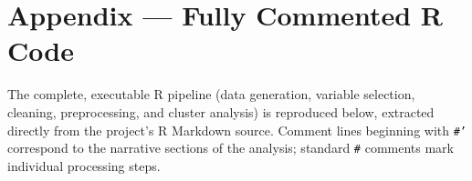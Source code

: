 \documentclass[11pt]{article}
\begin{document}
\clearpage
\appendix
\section{Appendix --- Fully Commented R Code}

The complete, executable R pipeline (data generation, variable selection, cleaning, preprocessing, and cluster analysis) is reproduced below, extracted directly from the project's R Markdown source. Comment lines beginning with \texttt{\#'} correspond to the narrative sections of the analysis; standard \texttt{\#} comments mark individual processing steps.


\end{document}
